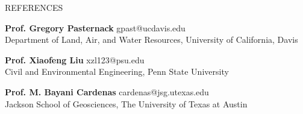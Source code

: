 \documentclass{resume_anzy} %
\begin{document}


\begin{rSection}{REFERENCES}
\vspace{-2.5mm}
\item \textbf{Prof. Gregory Pasternack} \hfill gpast@ucdavis.edu 
\\ \hspace*{\fill} Department of Land, Air, and Water Resources, University of California, Davis
\vspace{2mm}
\item \textbf{Prof. Xiaofeng Liu} \hfill xzl123@psu.edu
\\ \hspace*{\fill} Civil and Environmental Engineering, Penn State University
\vspace{2mm}
\item \textbf{Prof. M. Bayani Cardenas} \hfill cardenas@jsg.utexas.edu
\\ \hspace*{\fill} Jackson School of Geosciences, The University of Texas at Austin
\vspace{2mm}
\end{rSection}




\end{document}

